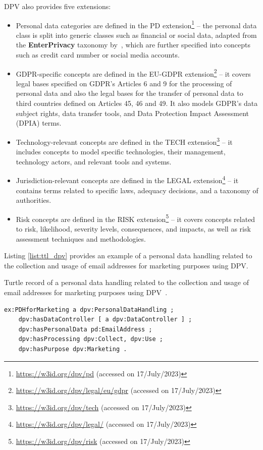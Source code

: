 DPV also provides five extensions:
\begin{itemize}
    \item Personal data categories are defined in the PD extension\footnote{\url{https://w3id.org/dpv/pd} (accessed on 17/July/2023)} -- the personal data class is split into generic classes such as financial or social data, adapted from the \textbf{EnterPrivacy} taxonomy by~\cite{cronk_categories_2017}, which are further specified into concepts such as credit card number or social media accounts.
    \item GDPR-specific concepts are defined in the EU-GDPR extension\footnote{\url{https://w3id.org/dpv/legal/eu/gdpr} (accessed on 17/July/2023)} -- it covers legal bases specified on GDPR's Articles 6 and 9 for the processing of personal data and also the legal bases for the transfer of personal data to third countries defined on Articles 45, 46 and 49. It also models GDPR's data subject rights, data transfer tools, and Data Protection Impact Assessment (DPIA) terms.
    \item Technology-relevant concepts are defined in the TECH extension\footnote{\url{https://w3id.org/dpv/tech} (accessed on 17/July/2023)} -- it includes concepts to model specific technologies, their management, technology actors, and relevant tools and systems.
    \item Jurisdiction-relevant concepts are defined in the LEGAL extension\footnote{\url{https://w3id.org/dpv/legal/} (accessed on 17/July/2023)} -- it contains terms related to specific laws, adequacy decisions, and a taxonomy of authorities.
    \item Risk concepts are defined in the RISK extension\footnote{\url{https://w3id.org/dpv/risk} (accessed on 17/July/2023)} -- it covers concepts related to risk, likelihood, severity levels, consequences, and impacts, as well as risk assessment techniques and methodologies.
\end{itemize}

Listing \ref{list:ttl_dpv} provides an example of a personal data handling related to the collection and usage of email addresses for marketing purposes using DPV.

\begin{listing}[ht]
\caption[Personal data handling modelling with DPV.]{Turtle record of a personal data handling related to the collection and usage of email addresses for marketing purposes using DPV~\citep{panetto_creating_2019}.}
\label{list:ttl_dpv}
\begin{verbatim}
ex:PDHforMarketing a dpv:PersonalDataHandling ;
    dpv:hasDataController [ a dpv:DataController ] ;
    dpv:hasPersonalData pd:EmailAddress ;
    dpv:hasProcessing dpv:Collect, dpv:Use ;
    dpv:hasPurpose dpv:Marketing .
\end{verbatim}
\end{listing}

